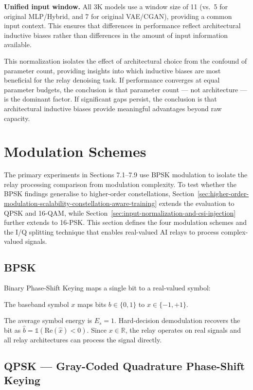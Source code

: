 \textbf{Unified input window.} All 3K models use a window size of 11 (vs.~5 for original MLP/Hybrid, and 7 for original VAE/CGAN), providing a common input context. This ensures that differences in performance reflect architectural inductive biases rather than differences in the amount of input information available.

This normalization isolates the effect of architectural choice from the confound of parameter count, providing insights into which inductive biases are most beneficial for the relay denoising task. If performance converges at equal parameter budgets, the conclusion is that parameter count --- not architecture --- is the dominant factor. If significant gaps persist, the conclusion is that architectural inductive biases provide meaningful advantages beyond raw capacity.

\section{Modulation Schemes}\label{sec:modulation-schemes}

The primary experiments in Sections 7.1--7.9 use BPSK modulation to isolate the relay processing comparison from modulation complexity. To test whether the BPSK findings generalise to higher-order constellations, Section~\ref{sec:higher-order-modulation-scalability-constellation-aware-training} extends the evaluation to QPSK and 16-QAM, while Section~\ref{sec:input-normalization-and-csi-injection} further extends to 16-PSK. This section defines the four modulation schemes and the I/Q splitting technique that enables real-valued AI relays to process complex-valued signals.

\subsection{BPSK}\label{sec:bpsk}

Binary Phase-Shift Keying maps a single bit to a real-valued symbol:

The baseband symbol \(x\) maps bits \(b \in \{0, 1\}\) to \(x \in \{-1, +1\}\).

The average symbol energy is \(E_s = 1\). Hard-decision demodulation recovers the bit as \(\hat{b} = \mathbb{1}(\text{Re}(\hat{x}) < 0)\). Since \(x \in \mathbb{R}\), the relay operates on real signals and all relay architectures can process the signal directly.

\subsection{QPSK --- Gray-Coded Quadrature Phase-Shift Keying}\label{sec:qpsk-gray-coded-quadrature-phase-shift-keying}

